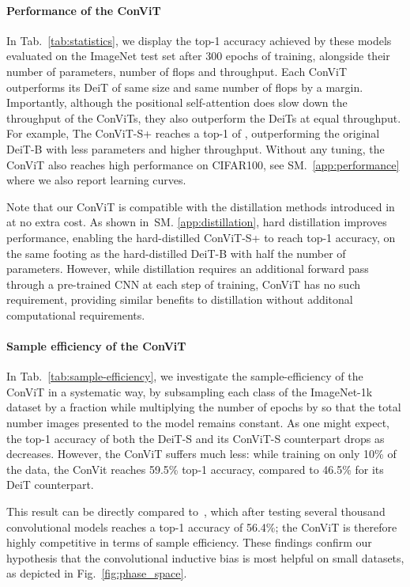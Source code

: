 \documentclass[a4paper,11pt,twocolumn]{article}
\newcommand{\citet}[1]{\textcite{#1}}
\begin{document}
\paragraph{Performance of the ConViT}

In Tab.~\ref{tab:statistics}, we display the top-1 accuracy achieved by these models evaluated on the ImageNet test set after 300 epochs of training, alongside their number of parameters, number of flops and throughput. Each ConViT outperforms its DeiT of same size and same number of flops by a margin. Importantly, although the positional self-attention does slow down the throughput of the ConViTs, they also outperform the DeiTs at equal throughput. For example, The ConViT-S+ reaches a top-1 of , outperforming the original DeiT-B with less parameters and higher throughput. Without any tuning, the ConViT also reaches high performance on CIFAR100, see SM.~\ref{app:performance} where we also report learning curves.

Note that our ConViT is compatible with the distillation methods introduced in~\citet{touvron2020training} at no extra cost. As shown in~SM. \ref{app:distillation}, hard distillation improves performance, enabling the hard-distilled ConViT-S+ to reach  top-1 accuracy, on the same footing as the hard-distilled DeiT-B with half the number of parameters. However, while distillation requires an additional forward pass through a pre-trained CNN at each step of training, ConViT has no such requirement, providing similar benefits to distillation without additonal computational requirements. 

\paragraph{Sample efficiency of the ConViT}

In Tab.~\ref{tab:sample-efficiency}, we investigate the sample-efficiency of the ConViT in a systematic way, by subsampling each class of the ImageNet-1k dataset by a fraction  while multiplying the number of epochs by  so that the total number images presented to the model remains constant. As one might expect, the top-1 accuracy of both the DeiT-S and its ConViT-S counterpart drops as  decreases. However, the ConViT suffers much less: while training on only 10\% of the data, the ConVit reaches 59.5\% top-1 accuracy, compared to 46.5\% for its DeiT counterpart.

This result can be directly compared to~\cite{zhai2019s4l}, which after testing several thousand convolutional models reaches a top-1 accuracy of 56.4\%; the ConViT is therefore highly competitive in terms of sample efficiency. These findings confirm our hypothesis that the convolutional inductive bias is most helpful on small datasets, as depicted in Fig.~\ref{fig:phase_space}.
\end{document}
